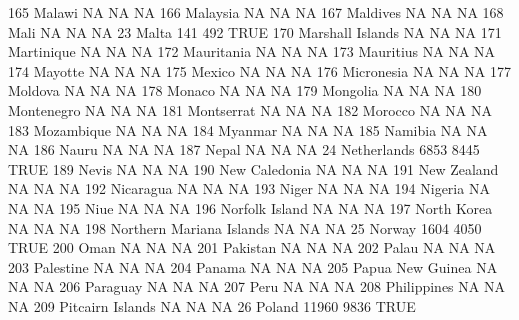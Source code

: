 \documentclass [a4paper] {article}
\begin{document}
\begin{Schunk}
\begin{Soutput}
165                              Malawi    NA    NA   NA
166                            Malaysia    NA    NA   NA
167                            Maldives    NA    NA   NA
168                                Mali    NA    NA   NA
23                                Malta   141   492 TRUE
170                    Marshall Islands    NA    NA   NA
171                          Martinique    NA    NA   NA
172                          Mauritania    NA    NA   NA
173                           Mauritius    NA    NA   NA
174                             Mayotte    NA    NA   NA
175                              Mexico    NA    NA   NA
176                          Micronesia    NA    NA   NA
177                             Moldova    NA    NA   NA
178                              Monaco    NA    NA   NA
179                            Mongolia    NA    NA   NA
180                          Montenegro    NA    NA   NA
181                          Montserrat    NA    NA   NA
182                             Morocco    NA    NA   NA
183                          Mozambique    NA    NA   NA
184                             Myanmar    NA    NA   NA
185                             Namibia    NA    NA   NA
186                               Nauru    NA    NA   NA
187                               Nepal    NA    NA   NA
24                          Netherlands  6853  8445 TRUE
189                               Nevis    NA    NA   NA
190                       New Caledonia    NA    NA   NA
191                         New Zealand    NA    NA   NA
192                           Nicaragua    NA    NA   NA
193                               Niger    NA    NA   NA
194                             Nigeria    NA    NA   NA
195                                Niue    NA    NA   NA
196                      Norfolk Island    NA    NA   NA
197                         North Korea    NA    NA   NA
198            Northern Mariana Islands    NA    NA   NA
25                               Norway  1604  4050 TRUE
200                                Oman    NA    NA   NA
201                            Pakistan    NA    NA   NA
202                               Palau    NA    NA   NA
203                           Palestine    NA    NA   NA
204                              Panama    NA    NA   NA
205                    Papua New Guinea    NA    NA   NA
206                            Paraguay    NA    NA   NA
207                                Peru    NA    NA   NA
208                         Philippines    NA    NA   NA
209                    Pitcairn Islands    NA    NA   NA
26                               Poland 11960  9836 TRUE

\end{Soutput}
\end{Schunk}
\end{document}
